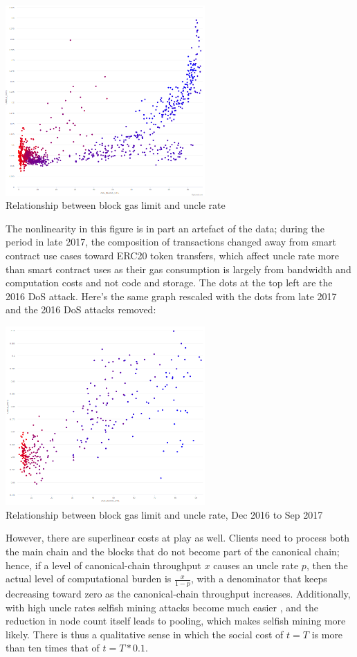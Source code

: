 \documentclass[12pt, final]{article}
\begin{document}
\begin{center}
\includegraphics[width=3in]{etherchain_correlation.png} \\
Relationship between block gas limit and uncle rate
\label{fig:three}
\end{center}

The nonlinearity in this figure is in part an artefact of the data; during the period in late 2017, the composition of transactions changed away from smart contract use cases toward ERC20 token transfers, which affect uncle rate more than smart contract uses as their gas consumption is largely from bandwidth and computation costs and not code and storage. The dots at the top left are the 2016 DoS attack. Here's the same graph rescaled with the dots from late 2017 and the 2016 DoS attacks removed:

\begin{center}
\includegraphics[width=3in]{etherchain_correlation_2.png} \\
Relationship between block gas limit and uncle rate, Dec 2016 to Sep 2017
\label{fig:three}
\end{center}

However, there are superlinear costs at play as well. Clients need to process both the main chain and the blocks that do not become part of the canonical chain; hence, if a level of canonical-chain throughput $x$ causes an uncle rate $p$, then the actual level of computational burden is $\frac{x}{1-p}$, with a denominator that keeps decreasing toward zero as the canonical-chain throughput increases. Additionally, with high uncle rates selfish mining attacks become much easier \cite{optimalsm}, and the reduction in node count itself leads to pooling, which makes selfish mining more likely. There is thus a qualitative sense in which the social cost of $t = T$ is more than ten times that of $t = T * 0.1$.
\end{document}
